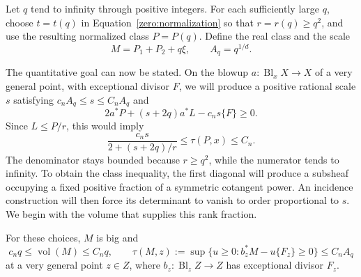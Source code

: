 Let \(q\) tend to infinity through positive integers.  For each sufficiently
large \(q\), choose \(t=t(q)\) in Equation~\eqref{zero:normalization} so that
\(r=r(q)\ge q^2\), and use the resulting normalized class \(P=P(q)\).
Define the real class and the scale
\begin{equation}\label{zero:M-definition}
 M=P_1+P_2+q\xi,\qquad A_q=q^{1/d}.
\end{equation}

The quantitative goal can now be stated.  On the blowup
\(a:\operatorname{Bl}_xX\to X\) of a very general point, with exceptional
divisor \(F\), we will produce a positive rational scale \(s\) satisfying
\(c_nA_q\le s\le C_nA_q\) and
\[
 2a^*P+(s+2q)a^*L-c_ns\{F\}\ge0.
\]
Since \(L\le P/r\), this would imply
\[
 \frac{c_ns}{2+(s+2q)/r}\le\tau(P,x)\le C_n.
\]
The denominator stays bounded because \(r\ge q^2\), while the numerator
tends to infinity.  To obtain the class inequality, the first diagonal
will produce a subsheaf occupying a fixed positive fraction of a
symmetric cotangent power.  An incidence construction will then force
its determinant to vanish to order proportional to \(s\).  We begin
with the volume that supplies this rank fraction.

\begin{lemma}\label{zero:two-slot-volume}
For these choices, \(M\) is big and
\begin{equation}\label{zero:M-bounds}
 c_nq\le\operatorname{vol}(M)\le C_nq,\qquad
 \tau(M,z):=\sup\{u\ge0:b_z^*M-u\{F_z\}\ge0\}\le C_nA_q
\end{equation}
at a very general point \(z\in Z\), where
\(b_z:\operatorname{Bl}_zZ\to Z\) has exceptional divisor \(F_z\).
\end{lemma}


